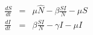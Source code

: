 \documentclass[12pt]{article}
\begin{document}
\begin{eqnarray*}
%
	\frac{dS}{dt}  &=& \mu \hat N - \beta \frac{SI}{N} -\mu S
	\\ \frac{dI}{dt}  &=& \beta \frac{SI}{N}- \gamma I - \mu I
%
\end{eqnarray*}
%
\end{document}
